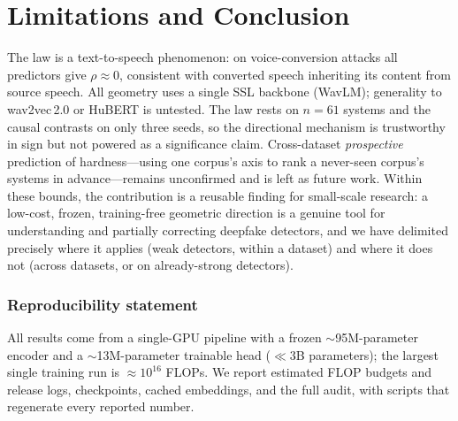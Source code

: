 \documentclass{article}
\begin{document}
\section{Limitations and Conclusion}
The law is a text-to-speech phenomenon: on voice-conversion attacks all predictors
give $\rho\approx0$, consistent with converted speech inheriting its content from
source speech. All geometry uses a single SSL backbone (WavLM); generality to
wav2vec\,2.0 or HuBERT is untested. The law rests on $n=61$ systems and the causal
contrasts on only three seeds, so the directional mechanism is trustworthy in sign
but not powered as a significance claim. Cross-dataset \emph{prospective}
prediction of hardness---using one corpus's axis to rank a never-seen corpus's
systems in advance---remains unconfirmed and is left as future work. Within these
bounds, the contribution is a reusable finding for small-scale research: a
low-cost, frozen, training-free geometric direction is a genuine tool for
understanding and partially correcting deepfake detectors, and we have delimited
precisely where it applies (weak detectors, within a dataset) and where it does not
(across datasets, or on already-strong detectors).

\subsubsection*{Reproducibility statement}
All results come from a single-GPU pipeline with a frozen $\sim$95M-parameter
encoder and a $\sim$13M-parameter trainable head ($\ll 3$B parameters); the largest
single training run is $\approx 10^{16}$ FLOPs. We report estimated FLOP budgets and
release logs, checkpoints, cached embeddings, and the full audit, with scripts that
regenerate every reported number.



\end{document}
